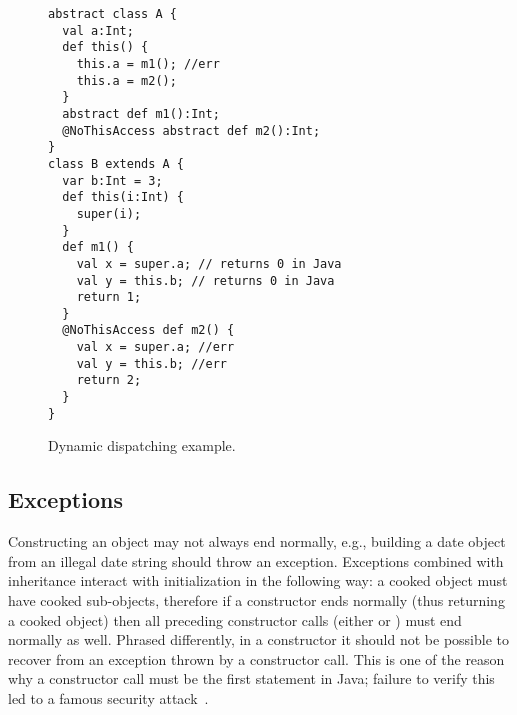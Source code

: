 \begin{figure}
\begin{lstlisting}
abstract class A {
  val a:Int;
  def this() {
    this.a = m1(); //err
    this.a = m2();
  }
  abstract def m1():Int;
  @NoThisAccess abstract def m2():Int;
}
class B extends A {
  var b:Int = 3;
  def this(i:Int) {
    super(i);
  }
  def m1() {
    val x = super.a; // returns 0 in Java
    val y = this.b; // returns 0 in Java
    return 1;
  }
  @NoThisAccess def m2() {
    val x = super.a; //err
    val y = this.b; //err
    return 2;
  }
}
\end{lstlisting}
\caption{Dynamic dispatching example.
    }
\label{Figure:Dynamic-dispatch}
\end{figure}




\subsection{Exceptions}
Constructing an object may not always end normally,
    e.g., building a date object from an illegal date string should throw an exception.
Exceptions combined with inheritance interact with initialization in the following way:
    a cooked object must have cooked sub-objects,
    therefore if a constructor ends normally (thus returning a cooked object)
    then all preceding constructor calls (either  or )
    must end normally as well.
Phrased differently, in a constructor it should not be possible to
    recover from an exception thrown by a constructor call.
This is one of the reason why a constructor call must be the first statement in Java;
    failure to verify this led to a famous security attack~\cite{Dean:1996}.


